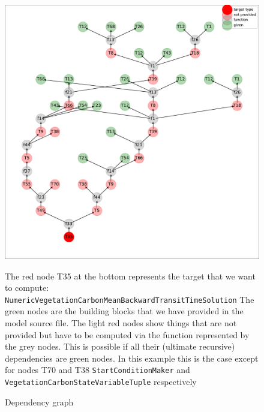 \begin{figure}[h]
  \label{fig:dep_graph}
  \includegraphics[width=\columnwidth]{dep_graph.pdf}
  \caption{ Dependency graph}
  The red node T35
  at the bottom represents the target that we want to
  compute: \texttt{NumericVegetationCarbonMeanBackwardTransitTimeSolution}
  The green nodes are the building blocks that we have provided in the
  model source file.
  The light red nodes show things that are not provided but have to be 
  computed via the function represented by the grey nodes. 
  This is possible if all their (ultimate recursive) dependencies
  are green nodes. 
  In this example this is the case except for nodes  T70 and T38
  \texttt{StartConditionMaker} and \texttt{VegetationCarbonStateVariableTuple} respectively 
  
\end{figure}  

